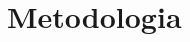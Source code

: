 \documentclass[
	12pt,				%
	oneside,			%
	a4paper,			%
	english,			%
	brazil				%
	]{abntex2ppgsi}
\begin{document}
  \section{Metodologia}



\end{document}

